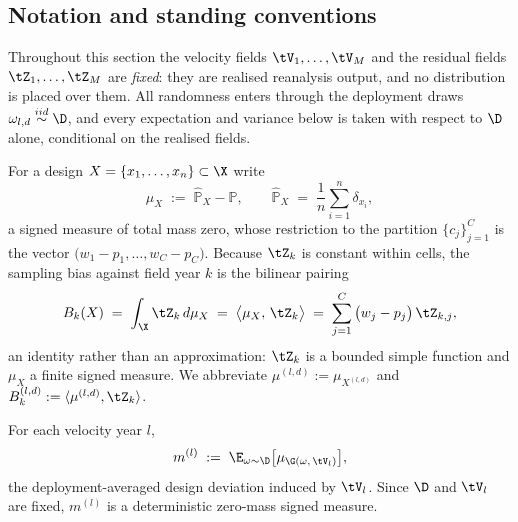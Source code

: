 %

\subsection{Notation and standing conventions}
\label{sec:loo-setup}

Throughout this section the velocity fields $\tV_1,\dots,\tV_M$ and the residual fields
$\tZ_1,\dots,\tZ_M$ are \emph{fixed}: they are realised reanalysis output, and no distribution is
placed over them. All randomness enters through the deployment draws
$\omega_{l,d} \overset{iid}{\sim} \D$, and every expectation and variance below is taken with
respect to $\D$ alone, conditional on the realised fields.

For a design $X = \{x_1,\dots,x_n\} \subset \X$ write
\begin{equation}
  \label{eq:mu-def}
  \mu_X \;:=\; \hat{\mathbb{P}}_X - \mathbb{P},
  \qquad
  \hat{\mathbb{P}}_X \;=\; \frac1n \sum_{i=1}^{n}\delta_{x_i},
\end{equation}
a signed measure of total mass zero, whose restriction to the partition $\{c_j\}_{j=1}^{C}$ is the
vector $\big(w_1 - p_1, \dots, w_C - p_C\big)$. Because $\tZ_k$ is constant within cells, the
sampling bias against field year $k$ is the bilinear pairing
\begin{equation}
  \label{eq:pairing}
  B_k(X) \;=\; \int_{\X} \tZ_k \, d\mu_X
  \;=\; \big\langle \mu_X,\, \tZ_k \big\rangle
  \;=\; \sum_{j=1}^{C}\big(w_j - p_j\big)\,\tZ_{k,j},
\end{equation}
an identity rather than an approximation: $\tZ_k$ is a bounded simple function and $\mu_X$ a finite
signed measure. We abbreviate $\mu^{(l,d)} := \mu_{X^{(l,d)}}$ and
$B_k^{(l,d)} := \langle \mu^{(l,d)}, \tZ_k\rangle$.

\begin{definition}
\label{def:footprint}
For each velocity year $l$,
\begin{equation}
  m^{(l)} \;:=\; \E_{\omega \sim \D}\big[\mu_{\G(\omega,\, \tV_l)}\big],
\end{equation}
the deployment-averaged design deviation induced by $\tV_l$. Since $\D$ and $\tV_l$ are fixed,
$m^{(l)}$ is a deterministic zero-mass signed measure.
\end{definition}

